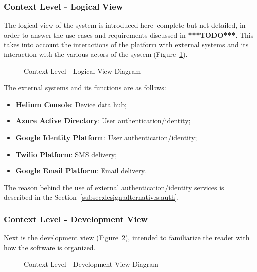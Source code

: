 \subsubsection*{Context Level - Logical View}
\label{subsubsec:design:architecture:context:logical}

The logical view of the system is introduced here, complete but not detailed, in order to answer the use cases and requirements discussed in \textbf{***TODO***}. This takes into account the interactions of the platform with external systems and its interaction with the various actors of the system (Figure~\ref{fig:design:architecture:context:logical:diagram}).

\begin{figure}[H]
   \centering
   \resizebox{\columnwidth}{!}
   {
      
   }
   \caption[Context Level - Logical View Diagram]{Context Level - Logical View Diagram}
   \label{fig:design:architecture:context:logical:diagram}
\end{figure}

The external systems and its functions are as follows:
\begin{itemize}
   \item \textbf{Helium Console}: Device data hub;
   \item \textbf{Azure Active Directory}: User authentication/identity;
   \item \textbf{Google Identity Platform}: User authentication/identity;
   \item \textbf{Twilio Platform}: SMS delivery;
   \item \textbf{Google Email Platform}: Email delivery.
\end{itemize}

The reason behind the use of external authentication/identity services is described in the Section~\ref{subsec:design:alternatives:auth}.

\subsubsection*{Context Level - Development View}
\label{subsubsec:design:architecture:context:development}

Next is the development view (Figure~\ref{fig:design:architecture:context:development:diagram}), intended to familiarize the reader with how the software is organized.

\begin{figure}[H]
   \centering
      
   \caption[Context Level - Development View Diagram]{Context Level - Development View Diagram}
   \label{fig:design:architecture:context:development:diagram}
\end{figure}

